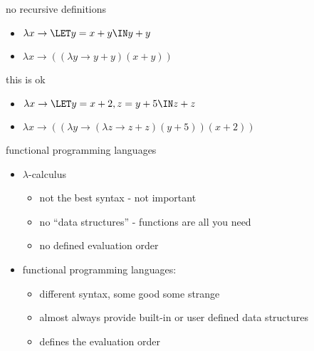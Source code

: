 \begin{frame}{no recursive definitions}
  \begin{itemize}  
   \pause \item $\lambda x \rightarrow  \LET y = x + y \IN y + y $
   \pause \item $\lambda x \rightarrow  ((\lambda y \rightarrow y + y) (x + y))$  
  \end{itemize}
\end{frame}

\begin{frame}{this is ok}
  \begin{itemize}  
   \pause \item $\lambda x \rightarrow  \LET y = x + 2 , z = y + 5 \IN z + z $
   \pause \item $\lambda x \rightarrow  ((\lambda y \rightarrow (\lambda z \rightarrow z + z)(y + 5)) (x + 2))$  
  \end{itemize}
\end{frame}



\begin{frame}{functional programming languages}

 \begin{itemize}
   \pause\item $\lambda$-calculus
       \begin{itemize}        
          \pause \item not the best syntax - not important 
          \pause \item no ``data structures'' - functions are all you need 
          \pause \item no defined evaluation order  
       \end{itemize}   
    \pause\item functional programming languages: 
       \begin{itemize}        
            \pause \item different syntax, some good some strange 
            \pause\item almost always provide built-in or user defined data structures 
            \pause\item defines the evaluation order 
       \end{itemize}               
 \end{itemize}
\end{frame}

